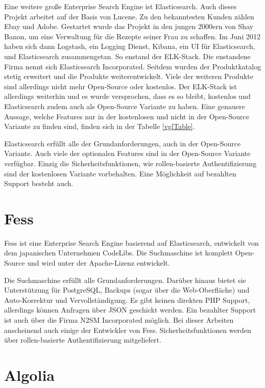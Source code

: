 Eine weitere große Enterprise Search Engine ist Elasticsearch. Auch dieses Projekt arbeitet auf der Basis von Lucene. Zu den bekanntesten Kunden zählen Ebay und Adobe. Gestartet wurde das Projekt in den jungen 2000ern von Shay Banon, um eine Verwaltung für die Rezepte seiner Frau zu schaffen. Im Juni 2012 haben sich dann Logstash, ein Logging Dienst, Kibana, ein UI für Elasticsearch, und Elasticsearch zusammengetan. So enstand der ELK-Stack. Die enstandene Firma nennt sich Elasticsearch Incorporated. Seitdem wurden der Produktkatalog stetig erweitert und die Produkte weiterentwickelt. Viele der weiteren Produkte sind allerdings nicht mehr Open-Source oder kostenlos. Der ELK-Stack ist allerdings weiterhin und es wurde versprochen, dass es so bleibt, kostenlos und Elasticsearch zudem auch als Open-Source Variante zu haben. Eine genauere Aussage, welche Features nur in der kostenlosen und nicht in der Open-Source Variante zu finden sind, finden sich in der Tabelle \ref{vglTable}.

Elasticsearch erfüllt alle der Grundanforderungen, auch in der Open-Source Variante. Auch viele der optionalen Features sind in der Open-Source Variante verfügbar. Einzig die Sicherheitsfunktionen, wie rollen-basierte Authentifizierung sind der kostenlosen Variante vorbehalten. Eine Möglichkeit auf bezahlten Support besteht auch. \cite{Elasticsearch.2019}

\section{Fess}
\label{fess}

Fess ist eine Enterprise Search Engine basierend auf Elasticsearch, entwickelt von dem japanischen Unternehmen CodeLibs. Die Suchmaschine ist komplett Open-Source und wird unter der Apache-Lizenz entwickelt.

Die Suchmaschine erfüllt alle Grundanforderungen. Darüber hinaus bietet sie Unterstützung für PostgreSQL, Backups (sogar über die Web-Oberfläche) und Auto-Korrektur und Vervollständigung. Es gibt keinen direkten PHP Support, allerdings können Anfragen über JSON geschickt werden. Ein bezahlter Support ist auch über die Firma N2SM Incorporated \cite{N2SM.2019} möglich. Bei dieser Arbeiten anscheinend auch einige der Entwickler von Fess. Sicherheitsfunktionen werden über rollen-basierte Authentifizierung mitgeliefert. \cite{CodeLibs.2019}

\section{Algolia}
\label{algolia}


